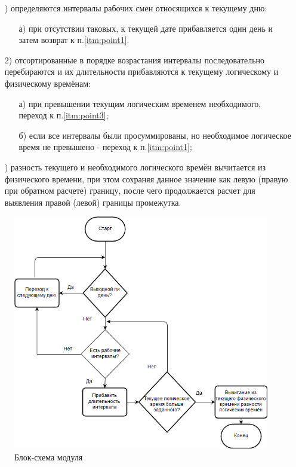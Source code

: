 \begin{enumerate}
	\item[\mylabel{itm:point1}{1})] определяются интервалы рабочих смен относящихся к текущему дню:
	      \begin{enumerate}
		      \item[а)] при отсутствии таковых, к текущей дате прибавляется один день и затем возврат к п.\ref{itm:point1}.
	      \end{enumerate}
	\item[2)] отсортированные в порядке возрастания интервалы последовательно перебираются и их длительности прибавляются к текущему логическому и физическому времёнам:
	      \begin{enumerate}
		      \item[а)] при превышении текущим логическим временем необходимого, переход к п.\ref{itm:point3};
		      \item[б)] если все интервалы были просуммированы, но необходимое логическое время не превышено - переход к п.\ref{itm:point1};
	      \end{enumerate}
	\item[\mylabel{itm:point3}{3})] разность текущего и необходимого логического времён вычитается из физического времени, при этом сохраняя данное значение как левую (правую при обратном расчете) границу, после чего продолжается расчет для выявления правой (левой) границы промежутка.
\end{enumerate}

\begin{figure}[h!]
	\centering
	\includegraphics[width=0.7\linewidth]{pics/scheduleSchema.png}
	\caption{Блок-схема модуля}
	\label{fig:schema}
\end{figure}

